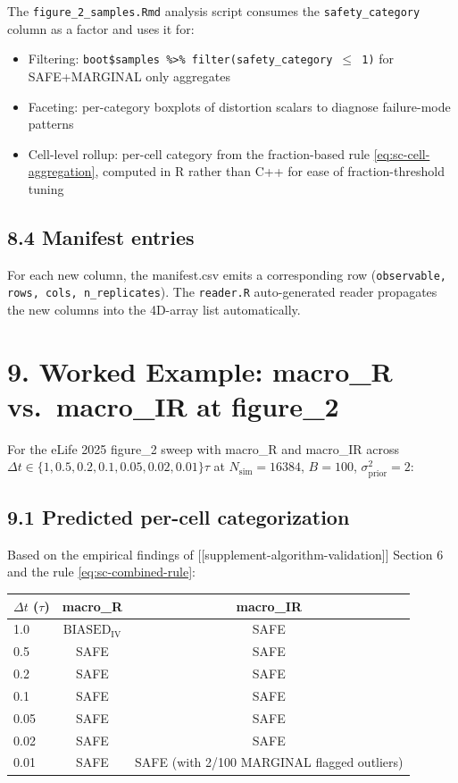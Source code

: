 \documentclass[11pt]{article}
\begin{document}
The \texttt{figure\_2\_samples.Rmd} analysis script consumes the
\texttt{safety\_category} column as a factor and uses it for:
\begin{itemize}
\item Filtering: \texttt{boot\$samples \%>\% filter(safety\_category $\leq$ 1)}
  for SAFE+MARGINAL only aggregates
\item Faceting: per-category boxplots of distortion scalars to
  diagnose failure-mode patterns
\item Cell-level rollup: per-cell category from the fraction-based
  rule \eqref{eq:sc-cell-aggregation}, computed in R rather than C++
  for ease of fraction-threshold tuning
\end{itemize}

\subsection*{8.4 Manifest entries}

For each new column, the manifest.csv emits a corresponding row
(\texttt{observable, rows, cols, n\_replicates}). The
\texttt{reader.R} auto-generated reader propagates the new columns
into the 4D-array list automatically.

\section*{9. Worked Example: macro\_R vs.\ macro\_IR at figure\_2}
\label{sec:sc-worked-example}

For the eLife 2025 figure\_2 sweep with macro\_R and macro\_IR across
$\Delta t \in \{1, 0.5, 0.2, 0.1, 0.05, 0.02, 0.01\}\tau$ at
$N_{\mathrm{sim}} = 16384$, $B = 100$, $\sigma^2_{\mathrm{prior}} = 2$:

\subsection*{9.1 Predicted per-cell categorization}

Based on the empirical findings of
[[supplement-algorithm-validation]] Section 6 and the rule
\eqref{eq:sc-combined-rule}:

\begin{center}
\begin{tabular}{lcc}
\hline
$\Delta t$ ($\tau$) & macro\_R & macro\_IR \\
\hline
1.0 & $\mathrm{BIASED}_{\mathrm{IV}}$ & SAFE \\
0.5 & SAFE & SAFE \\
0.2 & SAFE & SAFE \\
0.1 & SAFE & SAFE \\
0.05 & SAFE & SAFE \\
0.02 & SAFE & SAFE \\
0.01 & SAFE & SAFE (with 2/100 MARGINAL flagged outliers) \\
\hline
\end{tabular}
\end{center}
\end{document}
